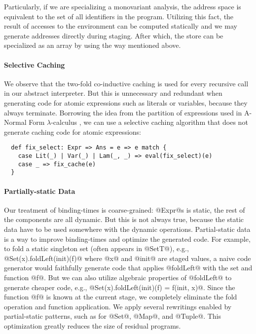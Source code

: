 Particularly, if we are specializing a monovariant analysis, the address space
is equivalent to the set of all identifiers in the program. Utilizing this fact, the
result of accesses to the environment can be computed statically and we may
generate addresses directly during staging. After which, the store can be
specialized as an array by using the way mentioned above.

\paragraph{Selective Caching} We observe that the two-fold co-inductive
caching is used for every recursive call in our abstract interpreter. But this
is unnecessary and redundant when generating code for atomic
expressions such as literals or variables, because they always terminate.
Borrowing the idea from the partition of expressions used in A-Normal Form
$\lambda$-calculus \cite{Flanagan:1993:ECC:155090.155113}, we can use a
selective caching algorithm that does not generate caching code for atomic
expressions:
\begin{lstlisting}
  def fix_select: Expr => Ans = e => e match {
    case Lit(_) | Var(_) | Lam(_, _) => eval(fix_select)(e)
    case _ => fix_cache(e)
  }
\end{lstlisting}

\paragraph{Partially-static Data}
Our treatment of binding-times is coarse-grained: @Expr@s is static, the rest
of the components are all dynamic. But this is not always true, because the
static data have to be used somewhere with the dynamic operations.
Partial-static data is a way to improve binding-times and optimize the
generated code.
For example, to fold a static singleton set (often appears in @SetT@), e.g.,
@Set(x).foldLeft(init)(f)@ where @x@ and @init@ are staged values, a naive code
generator would faithfully generate code that applies @foldLeft@ with the set
and function @f@. But we can also utilize algebraic properties of @foldLeft@
to generate cheaper code, e.g., @Set(x).foldLeft(init)(f) = f(init, x)@. Since the
function @f@ is known at the current stage, we completely eliminate the fold
operation and function application. We apply several rewritings enabled by
partial-static patterns, such as for @Set@, @Map@, and @Tuple@. This
optimization greatly reduces the size of residual programs.

